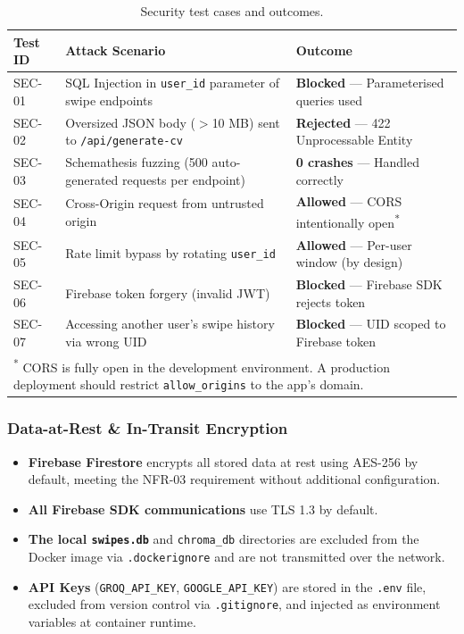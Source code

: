 \documentclass[12pt, a4paper, oneside]{report}
\begin{document}
\begin{table}[H]
  \centering
  \caption{Security test cases and outcomes.}
  \label{tab:security-tests}
  \renewcommand{\arraystretch}{1.3}
  \begin{tabularx}{\textwidth}{@{} l X X @{}}
    \toprule
    \textbf{Test ID} & \textbf{Attack Scenario} & \textbf{Outcome} \\
    \midrule
    SEC-01 & SQL Injection in \texttt{user\_id} parameter of swipe endpoints & \textbf{Blocked} — Parameterised queries used \\
    SEC-02 & Oversized JSON body ($>$10 MB) sent to \texttt{/api/generate-cv} & \textbf{Rejected} — 422 Unprocessable Entity \\
    SEC-03 & Schemathesis fuzzing (500 auto-generated requests per endpoint) & \textbf{0 crashes} — Handled correctly \\
    SEC-04 & Cross-Origin request from untrusted origin & \textbf{Allowed} — CORS intentionally open\textsuperscript{*} \\
    SEC-05 & Rate limit bypass by rotating \texttt{user\_id} & \textbf{Allowed} — Per-user window (by design) \\
    SEC-06 & Firebase token forgery (invalid JWT) & \textbf{Blocked} — Firebase SDK rejects token \\
    SEC-07 & Accessing another user's swipe history via wrong UID & \textbf{Blocked} — UID scoped to Firebase token \\
    \bottomrule
    \multicolumn{3}{p{\dimexpr\textwidth-2\tabcolsep\relax}}{\small\textsuperscript{*} CORS is fully open in the development environment. A production deployment should restrict \texttt{allow\_origins} to the app's domain.}
  \end{tabularx}
\end{table}

\subsubsection*{Data-at-Rest \& In-Transit Encryption}

\begin{itemize}[itemsep=3pt]
  \item \textbf{Firebase Firestore} encrypts all stored data at rest using AES-256 by
        default, meeting the NFR-03 requirement without additional configuration.
  \item \textbf{All Firebase SDK communications} use TLS 1.3 by default.
  \item \textbf{The local \texttt{swipes.db}} and \texttt{chroma\_db} directories are
        excluded from the Docker image via \texttt{.dockerignore} and are not transmitted
        over the network.
  \item \textbf{API Keys} (\texttt{GROQ\_API\_KEY}, \texttt{GOOGLE\_API\_KEY}) are stored
        in the \texttt{.env} file, excluded from version control via \texttt{.gitignore},
        and injected as environment variables at container runtime.
\end{itemize}
\end{document}
